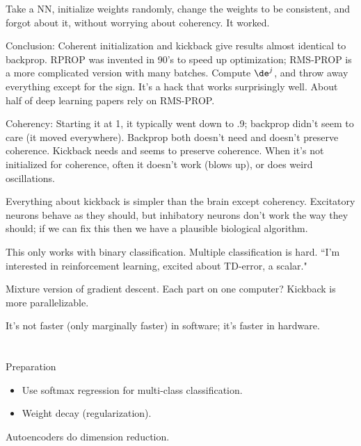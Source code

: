 Take a NN, initialize weights randomly, change the weights to be consistent, and forgot about it, without worrying about coherency. It worked.

Conclusion: Coherent initialization and kickback give results almost identical to backprop. %
RPROP was invented in 90's to speed up optimization; RMS-PROP  is a more complicated version with many batches. Compute $\de^j$, and throw away everything except for the sign. It's a hack that works surprisingly well. About half of deep learning papers rely on RMS-PROP.

Coherency: Starting it at 1, it typically went down to .9; backprop didn't seem to care (it moved everywhere). Backprop both doesn't need and doesn't preserve coherence. Kickback needs and seems to preserve coherence. 
When it's not initialized for coherence, often it doesn't work (blows up), or does weird oscillations. 

Everything about kickback is simpler than the brain except coherency. Excitatory neurons behave as they should, but inhibatory neurons don't work the way they should; if we can fix this then we have a plausible biological algorithm.



This only works with binary classification. Multiple classification is hard. ``I'm interested in reinforcement learning, excited about 
TD-error, a scalar."

Mixture version of gradient descent. Each part on one computer?
Kickback is more parallelizable.

It's not faster (only marginally faster) in software; it's faster in hardware.




\section{}

Preparation
\begin{itemize}
\item
Use softmax regression for multi-class classification.
\item
Weight decay (regularization).
\end{itemize}
Autoencoders do dimension reduction.


